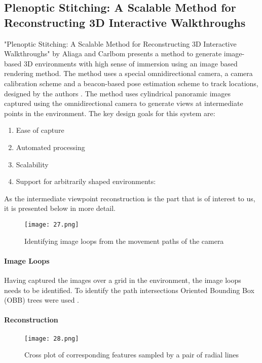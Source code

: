 \subsection{Plenoptic Stitching: A Scalable Method for Reconstructing 3D Interactive Walkthroughs}

"Plenoptic Stitching: A Scalable Method for Reconstructing 3D Interactive Walkthroughs" by Aliaga and Carlbom \cite{Aliaga2001}  presents a method to generate image-based 3D environments with high sense of immersion using an image based rendering method. The method uses a special omnidirectional camera, a camera calibration scheme and a beacon-based pose estimation scheme to track locations, designed by the authors \cite{Aliga001}.  The method uses cylindrical panoramic images captured using the omnidirectional camera to generate views at intermediate points in the environment.  The key design goals for this system are:
\begin{enumerate}
\item Ease of capture
\item Automated processing
\item Scalability
\item Support for arbitrarily shaped environments:
\end{enumerate}

As the intermediate viewpoint reconstruction is the part that is of interest to us, it is presented below in more detail.

\begin{figure}[htbp]
\sidecaption
\texttt{[image: 27.png]}
\caption{Identifying image loops from the movement paths of the camera}
\label{Fig_27_loops}       %
\end{figure}

\paragraph*{\textbf{Image Loops}}
Having captured the images over a grid in the environment, the image loops needs to be identified. To identify the path intersections Oriented Bounding Box (OBB) trees were used \cite{Gottschalk96}.

\paragraph*{\textbf{Reconstruction}}

\begin{figure}[htbp]
\sidecaption
\texttt{[image: 28.png]}
\caption{Cross plot of corresponding features sampled by a pair of radial lines}
\label{Fig_28_cross_plot}       %
\end{figure}

